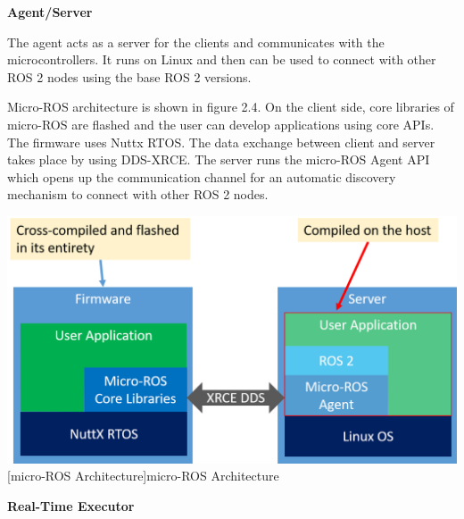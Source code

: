 \documentclass[%
xelatex,
	oneside,		%
	12pt,			%
	parskip=half,	%
	abstracton,
	chapterprefix=true%
    appendixprefix=true]
{scrbook}
\begin{document}
 {\bfseries Agent/Server}
 
 
 \vspace*{0.5cm}
 The agent acts as a server for the clients and communicates with the microcontrollers. It runs on Linux and then can be used to connect with other ROS 2 nodes using the base ROS 2 versions.
 
  \vspace*{0.5cm}
Micro-ROS architecture is shown in figure 2.4. On the client side, core libraries of micro-ROS are flashed and the user can develop applications using core APIs. The  firmware uses Nuttx RTOS. The data exchange between client and server takes place by using DDS-XRCE. The server runs the micro-ROS Agent API which opens up the communication channel for an automatic discovery mechanism to connect with other ROS 2 nodes.
  \begin{center}
\includegraphics[scale=0.4]{fig/uros_arc.jpg}
[micro-ROS Architecture]{micro-ROS Architecture \cite{urosarc}}
\label{fig:urosarc}
\end{center}

  {\bfseries Real-Time Executor}
  \vspace*{0.5cm}
  
\end{document}
